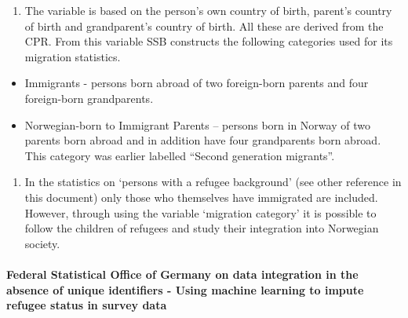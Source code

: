 \documentclass[
]{article}
\providecommand{\tightlist}{%
  \setlength{\itemsep}{0pt}\setlength{\parskip}{0pt}}
\begin{document}
\begin{enumerate}
\def\labelenumi{\arabic{enumi}.}
\setcounter{enumi}{259}
\tightlist
\item
  The variable is based on the person's own country of birth,
  parent's country of birth and grandparent's country of birth. All
  these are derived from the CPR. From this variable SSB constructs
  the following categories used for its migration statistics.
\end{enumerate}

\begin{itemize}
\item
  Immigrants - persons born abroad of two foreign-born parents and
  four foreign-born grandparents.
\item
  Norwegian-born to Immigrant Parents -- persons born in Norway of two
  parents born abroad and in addition have four grandparents born
  abroad. This category was earlier labelled ``Second generation
  migrants''.
\end{itemize}

\begin{enumerate}
\def\labelenumi{\arabic{enumi}.}
\setcounter{enumi}{260}
\tightlist
\item
  In the statistics on `persons with a refugee background' (see other
  reference in this document) only those who themselves have
  immigrated are included. However, through using the variable
  `migration category' it is possible to follow the children of
  refugees and study their integration into Norwegian society.
\end{enumerate}

\hypertarget{federal-statistical-office-of-germany-on-data-integration-in-the-absence-of-unique-identifiers---using-machine-learning-to-impute-refugee-status-in-survey-data}{%
\paragraph{Federal Statistical Office of Germany on data integration in the absence of unique identifiers - Using machine learning to impute refugee status in survey data}\label{federal-statistical-office-of-germany-on-data-integration-in-the-absence-of-unique-identifiers---using-machine-learning-to-impute-refugee-status-in-survey-data}}
\end{document}
